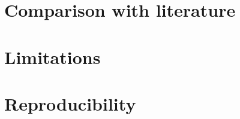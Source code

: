 \documentclass[11pt]{article}
\begin{document}
\section{Comparison with literature}
%
%

\section{Limitations}
%

\section{Reproducibility}



\end{document}
